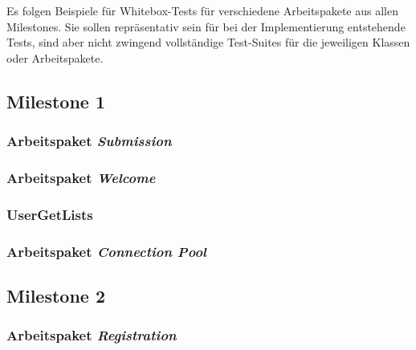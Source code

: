 \lstset{
    language=Java,
    basicstyle=\ttfamily\selectfont\scriptsize,
}

\newcommand{\testlisting}[1]{}

Es folgen Beispiele für Whitebox-Tests für verschiedene Arbeitspakete aus allen Milestones.
Sie sollen repräsentativ sein für bei der Implementierung entstehende Tests, sind aber nicht zwingend vollständige
Test-Suites für die jeweiligen Klassen oder Arbeitspakete.

\subsection{Milestone 1}\label{subsec:milestone1}

\subsubsection{Arbeitspaket \emph{Submission}}
\testlisting{SubmissionBackingTest}
\testlisting{SubmissionServiceTest}
\testlisting{SubmissionRepositoryTest}

\subsubsection{Arbeitspaket \emph{Welcome}}
\testlisting{LoginServiceTest}

\subsubsection{UserGetLists}
\testlisting{UserRepositoryGetListTest}
\subsubsection{Arbeitspaket \emph{Connection Pool}}
\testlisting{TransactionTest}
\testlisting{ConnectionPoolTest}

\subsection{Milestone 2}\label{subsec:milestone2}

\subsubsection{Arbeitspaket \emph{Registration}}
\testlisting{PasswordValidatorTest}
\testlisting{RegistrationServiceTest}
\testlisting{UserRepositoryTest}

